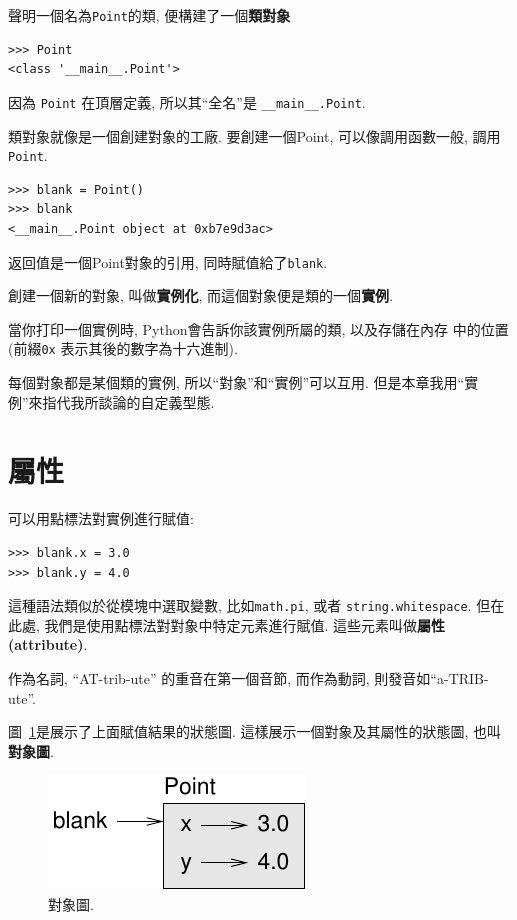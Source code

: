 \documentclass[10pt]{book}
\begin{document}
聲明一個名為{\tt Point}的類, 便構建了一個{\bf 類對象}

\begin{verbatim}
>>> Point
<class '__main__.Point'>
\end{verbatim}
%
因為 {\tt Point} 在頂層定義, 所以其``全名''是 \verb"__main__.Point".

類對象就像是一個創建對象的工廠. 
要創建一個Point,  可以像調用函數一般, 調用{\tt Point}.

\begin{verbatim}
>>> blank = Point()
>>> blank
<__main__.Point object at 0xb7e9d3ac>
\end{verbatim}
%
返回值是一個Point對象的引用, 同時賦值給了{\tt blank}.  

創建一個新的對象, 叫做{\bf 實例化}, 
而這個對象便是類的一個{\bf 實例}. 

當你打印一個實例時, Python會告訴你該實例所屬的類, 以及存儲在內存
中的位置(前綴{\tt 0x} 表示其後的數字為十六進制).

每個對象都是某個類的實例, 所以``對象''和``實例''可以互用. 
但是本章我用``實例''來指代我所談論的自定義型態. 


\section{屬性}
\label{attributes}
可以用點標法對實例進行賦值:

\begin{verbatim}
>>> blank.x = 3.0
>>> blank.y = 4.0
\end{verbatim}
%

這種語法類似於從模塊中選取變數, 比如{\tt math.pi}, 或者 {\tt string.whitespace}. 
但在此處, 我們是使用點標法對對象中特定元素進行賦值. 
這些元素叫做{\bf 屬性(attribute)}. 

作為名詞, ``AT-trib-ute'' 的重音在第一個音節, 而作為動詞,  則發音如``a-TRIB-ute''. 

圖~\ref{fig.point}是展示了上面賦值結果的狀態圖. 
這樣展示一個對象及其屬性的狀態圖, 也叫{\bf 對象圖}. 

\begin{figure}
\centerline
{\includegraphics[scale=0.8]{figs/point.pdf}}
\caption{對象圖.}
\label{fig.point}
\end{figure}
\end{document}
